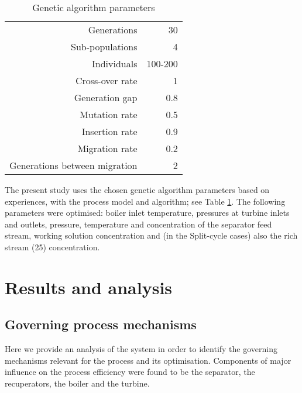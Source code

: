 \documentclass[review,3p]{elsarticle}
\begin{document}
\begin{table}
\centering
\caption{Genetic algorithm parameters}
%
\scriptsize

\begin{tabular}{rr}
\toprule
Generations &         30 \\
Sub-populations  &         4 \\
Individuals &   100-200 \\
Cross-over rate &          1 \\
Generation gap &        0.8 \\
Mutation rate &        0.5 \\
Insertion rate &        0.9 \\
Migration rate &        0.2 \\
Generations between migration &          2 \\
\bottomrule
\end{tabular}  

\label{tab:GAParameters}
\end{table}

The present study uses the chosen genetic algorithm parameters based on experiences, with the process model and algorithm; see Table \ref{tab:GAParameters}. The following parameters were optimised: boiler inlet temperature, pressures at turbine inlets and outlets, pressure, temperature and concentration of the separator feed stream, working solution concentration and (in the Split-cycle cases) also the rich stream (25) concentration.




\section{Results and analysis}
\label{sec:resultsAnalysis}


\subsection{Governing process mechanisms}
\label{subsec:governingMechanisms}
Here we provide an analysis of the system in order to identify the governing mechanisms relevant for the process and its optimisation. Components of major influence on the process efficiency were found to be the separator, the recuperators, the boiler and the turbine.
\end{document}
